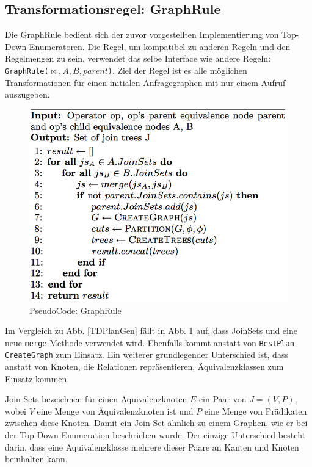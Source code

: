 \subsection{Transformationsregel: GraphRule}

Die GraphRule \cite{shanbhag2014optimizing} bedient sich der zuvor vorgestellten Implementierung von Top-Down-Enumeratoren. Die Regel, um kompatibel zu anderen Regeln und den Regelmengen zu sein, verwendet das selbe Interface wie andere Regeln: \texttt{GraphRule($\Join, A, B, parent$)}.  Ziel der Regel ist es alle möglichen Transformationen für einen initialen Anfragegraphen mit nur einem Aufruf auszugeben. 

\begin{figure}[ht]
  \centering
  \includegraphics[scale=0.4]{03_Regeln/00_media/GraphRule.png}
  \caption{PseudoCode: GraphRule}
  \label{GraphRule}
\end{figure}

Im Vergleich zu Abb. \ref{TDPlanGen} fällt in Abb. \ref{GraphRule} auf, dass JoinSets und eine neue \texttt{merge}-Methode verwendet wird. Ebenfalls kommt anstatt von \texttt{BestPlan} \texttt{CreateGraph} zum Einsatz. Ein weiterer grundlegender Unterschied ist, dass anstatt von Knoten, die Relationen repräsentieren, Äquivalenzklassen zum Einsatz kommen.

Join-Sets bezeichnen für einen Äquivalenzknoten $E$ ein Paar von $J = (V,P)$, wobei $V$ eine Menge von Äquivalenzknoten ist und $P$ eine Menge von Prädikaten zwischen diese Knoten.  Damit ein Join-Set ähnlich zu einem Graphen, wie er bei der Top-Down-Enumeration beschrieben wurde. Der einzige Unterschied besteht darin, dass eine Äquivalenzklasse mehrere dieser Paare an Kanten und Knoten beinhalten kann.

